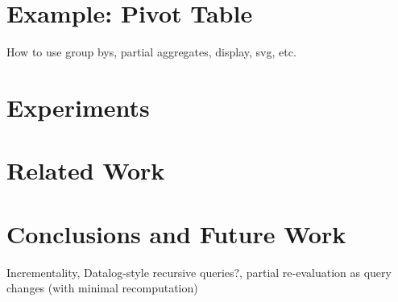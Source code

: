 \documentclass[runningheads]{llncs}
\begin{document}
\section{Example: Pivot Table}\label{sec:case_study}
How to use group bys, partial aggregates, display, svg, etc.

\section{Experiments}\label{sec:experiments}


\section{Related Work}\label{sec:related_work}

\section{Conclusions and Future Work}\label{sec:conclusions}
Incrementality, Datalog-style recursive queries?, partial re-evaluation as
query changes (with minimal recomputation)
%
%



\end{document}
